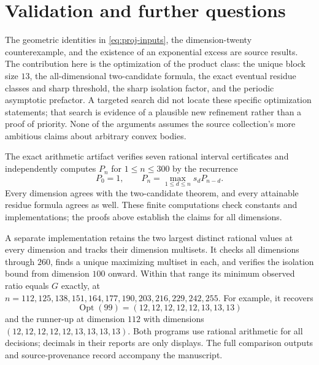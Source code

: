 \section{Validation and further questions}

The geometric identities in \eqref{eq:proj-inputs}, the dimension-twenty
counterexample, and the existence of an exponential excess are source
results. The contribution here is the optimization of the product
class: the unique block size $13$, the all-dimensional two-candidate
formula, the exact eventual residue classes and sharp threshold, the
sharp isolation factor, and the periodic asymptotic prefactor.
A targeted search did not locate these specific optimization statements;
that search is evidence of a plausible new refinement rather than a
proof of priority. None of the arguments assumes the source collection's
more ambitious claims about arbitrary convex bodies.

The exact arithmetic artifact verifies seven rational interval
certificates and independently computes $P_n$ for $1\le n\le300$ by
the recurrence
\[
 P_0=1,\qquad P_n=\max_{1\le d\le n}s_dP_{n-d}.
\]
Every dimension agrees with the two-candidate theorem, and every
attainable residue formula agrees as well. These finite computations
check constants and implementations; the proofs above establish the
claims for all dimensions.

A separate implementation retains the two largest distinct rational
values at every dimension and tracks their dimension multisets. It
checks all dimensions through $260$, finds a unique maximizing multiset
in each, and verifies the isolation bound from dimension $100$ onward.
Within that range its minimum observed ratio equals $G$ exactly, at
$n=112,125,138,151,164,177,190,203,216,229,242,255$.
For example, it recovers
\[
 \operatorname{Opt}(99)=(12,12,12,12,12,13,13,13)
\]
and the runner-up at dimension $112$ with dimensions
$(12,12,12,12,12,13,13,13,13)$.
Both programs use rational arithmetic for all decisions; decimals in
their reports are only displays. The full comparison outputs and
source-provenance record accompany the manuscript.

